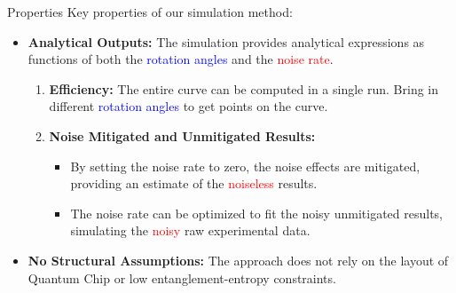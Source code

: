 \documentclass[10pt]{beamer}
\begin{document}
\begin{CJK}{UTF8}{gbsn}
\begin{frame}[fragile]{Properties}
  Key properties of our simulation method:
  \begin{itemize}
    \item \textbf{Analytical Outputs:}
    The simulation provides analytical expressions as functions of both the \textcolor{blue}{rotation angles} and the \textcolor{red}{noise rate}.
    \begin{enumerate}
    \item \textbf{Efficiency:}
    The entire curve can be computed in a single run.
    Bring in different \textcolor{blue}{rotation angles} to get points on the curve.
    \item \textbf{Noise Mitigated and Unmitigated Results:}
    \begin{itemize}
      \item By setting the noise rate to zero, the noise effects are mitigated, providing an estimate of the \textcolor{red}{noiseless} results.
      \item The noise rate can be optimized to fit the noisy unmitigated results, simulating the \textcolor{red}{noisy} raw experimental data.
    \end{itemize}
    \end{enumerate}
    \item \textbf{No Structural Assumptions:} 
    The approach does not rely on the layout of Quantum Chip or low entanglement-entropy constraints.
  \end{itemize}
\end{frame}
\end{CJK}
\end{document}
